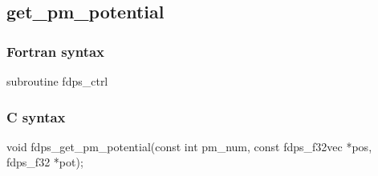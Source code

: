 \subsection{get\_pm\_potential}
\subsubsection*{Fortran syntax}
\begin{screen}
\begin{spverbatim}
subroutine fdps_ctrl%
\end{spverbatim}
\end{screen}

\subsubsection*{C syntax}
\begin{screen}
\begin{spverbatim}
void fdps_get_pm_potential(const int pm_num,
                           const fdps_f32vec *pos,
                           fdps_f32 *pot);
\end{spverbatim}
\end{screen}


